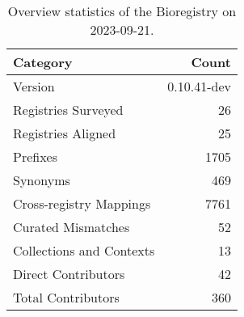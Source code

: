 \begin{table}
\caption{Overview statistics of the Bioregistry on 2023-09-21.}
\label{tab:bioregistry-summary}
\begin{tabular}{lr}
\toprule
Category & Count \\
\midrule
Version & 0.10.41-dev \\
Registries Surveyed & 26 \\
Registries Aligned & 25 \\
Prefixes & 1705 \\
Synonyms & 469 \\
Cross-registry Mappings & 7761 \\
Curated Mismatches & 52 \\
Collections and Contexts & 13 \\
Direct Contributors & 42 \\
Total Contributors & 360 \\
\bottomrule
\end{tabular}
\end{table}

